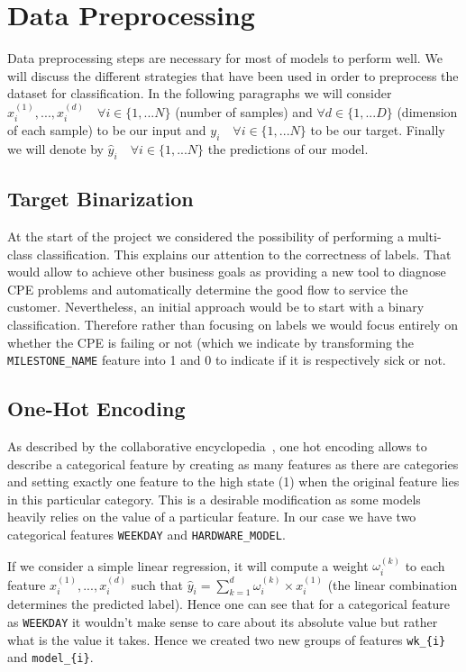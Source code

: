\section{Data Preprocessing}
\label{sec:datapreprocessing}
Data preprocessing steps are necessary for most of models to perform well. We will discuss the different strategies that have been used in order to preprocess the dataset for classification. In the following paragraphs we will consider $x_i^{(1)},...,x_i^{(d)} \quad \forall i\in \{1,...N\}$ (number of samples) and  $\forall d \in \{1,...D\}$ (dimension of each sample) to be our input and $y_i \quad \forall i\in \{1,...N\}$ to be our target. Finally we will denote by $\hat{y}_i \quad \forall i\in \{1,...N\}$ the predictions of our model.

\subsection{Target Binarization}
At the start of the project we considered the possibility of performing a multi-class classification. This explains our attention to the correctness of labels. That would allow to achieve other business goals as providing a new tool to diagnose CPE problems and automatically determine the good flow to service the customer. Nevertheless, an initial approach would be to start with a binary classification. Therefore rather than focusing on labels we would focus entirely on whether the CPE is failing or not (which we indicate by transforming the \texttt{MILESTONE\_NAME} feature into 1 and 0 to indicate if it is respectively sick or not.
 
\subsection{One-Hot Encoding}
\label{subsec:one_hot}
As described by the collaborative encyclopedia~\cite{wiki:onehot}, one hot encoding allows to describe a categorical feature by creating as many features as there are categories and setting exactly one feature to the high state (1) when the original feature lies in this particular category. This is a desirable modification as some models heavily relies on the value of a particular feature. In our case we have two categorical features \texttt{WEEKDAY} and \texttt{HARDWARE\_MODEL}. 

If we consider a simple linear regression, it will compute a weight $\omega_i^{(k)}$ to each feature $x_i^{(1)},...,x_i^{(d)}$ such that $\hat{y}_i=\sum_{k=1}^d{\omega_i^{(k)}\times x_i^{(1)}}$ (the linear combination determines the predicted label). Hence one can see that for a categorical feature as \texttt{WEEKDAY} it wouldn't make sense to care about its absolute value but rather what is the value it takes. Hence we created two new groups of features \texttt{wk\_\{i\}} and \texttt{model\_\{i\}}.


